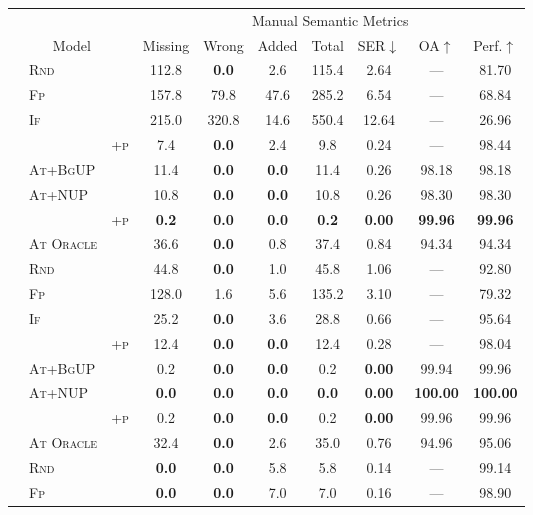 \begin{table*}[t!]
\begin{tabular}{lll c c c c  c c c}
\toprule
 & & &  \multicolumn{7}{c}{Manual Semantic Metrics} \\
\cmidrule(lr){4-10} 
\multicolumn{3}{c}{Model} &  Missing &  Wrong & Added & Total & SER$\downarrow$ & OA$\uparrow$ & Perf.$\uparrow$\\
\midrule
\parbox[t]{2mm}{}
&\textsc{Rnd} & &112.8&\textbf{  0.0}&2.6&115.4&2.64&---&81.70 \\
&\textsc{Fp} & &157.8&79.8&47.6&285.2&6.54&---&68.84 \\
&\textsc{If} & &215.0&320.8&14.6&550.4&12.64&---&26.96 \\
&  & \textsc{+p}&7.4&\textbf{  0.0}&2.4&9.8&0.24&---&98.44 \\
&\textsc{At+BgUP} & &11.4&\textbf{  0.0}&\textbf{  0.0}&11.4&0.26&98.18&98.18 \\
&\textsc{At+NUP} & &10.8&\textbf{  0.0}&\textbf{  0.0}&10.8&0.26&98.30&98.30 \\
&  & \textsc{+p}&\textbf{  0.2}&\textbf{  0.0}&\textbf{  0.0}&\textbf{  0.2}&\textbf{ 0.00}&\textbf{99.96}&\textbf{99.96} \\
&\textsc{At Oracle} & &36.6&\textbf{  0.0}&0.8&37.4&0.84&94.34&94.34 \\
\midrule
\parbox[t]{2mm}{}
&\textsc{Rnd} & &44.8&\textbf{  0.0}&1.0&45.8&1.06&---&92.80 \\
&\textsc{Fp} & &128.0&1.6&5.6&135.2&3.10&---&79.32 \\
&\textsc{If} & &25.2&\textbf{  0.0}&3.6&28.8&0.66&---&95.64 \\
&  & \textsc{+p}&12.4&\textbf{  0.0}&\textbf{  0.0}&12.4&0.28&---&98.04 \\
&\textsc{At+BgUP} & &0.2&\textbf{  0.0}&\textbf{  0.0}&0.2&\textbf{ 0.00}&99.94&99.96 \\
&\textsc{At+NUP} & &\textbf{  0.0}&\textbf{  0.0}&\textbf{  0.0}&\textbf{  0.0}&\textbf{ 0.00}&\textbf{100.00}&\textbf{100.00} \\
&  & \textsc{+p}&0.2&\textbf{  0.0}&\textbf{  0.0}&0.2&\textbf{ 0.00}&99.96&99.96 \\
&\textsc{At Oracle} & &32.4&\textbf{  0.0}&2.6&35.0&0.76&94.96&95.06 \\
\midrule
\parbox[t]{2mm}{}
&\textsc{Rnd} & &\textbf{  0.0}&\textbf{  0.0}&5.8&5.8&0.14&---&99.14 \\
&\textsc{Fp} & &\textbf{  0.0}&\textbf{  0.0}&7.0&7.0&0.16&---&98.90 \\

\end{tabular}
\end{table*}
